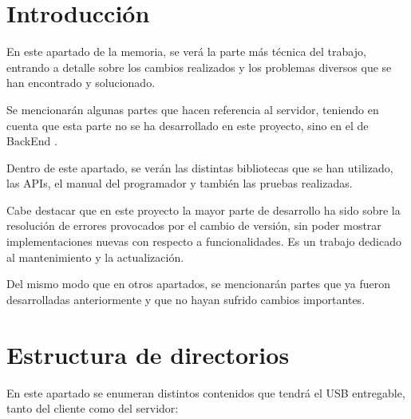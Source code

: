 
\section{Introducción}

En este apartado de la memoria, se verá la parte más técnica del trabajo, entrando a detalle sobre los cambios realizados y los problemas diversos que se han encontrado y solucionado.

Se mencionarán algunas partes que hacen referencia al servidor, teniendo en cuenta que esta parte no se ha desarrollado en este proyecto, sino en el de BackEnd \cite{tfg2}.

Dentro de este apartado, se verán las distintas bibliotecas que se han utilizado, las APIs, el manual del programador y también las pruebas realizadas. 

Cabe destacar que en este proyecto la mayor parte de desarrollo ha sido sobre la resolución de errores provocados por el cambio de versión, sin poder mostrar implementaciones nuevas con respecto a funcionalidades. Es un trabajo dedicado al mantenimiento y la actualización.

Del mismo modo que en otros apartados, se mencionarán partes que ya fueron desarrolladas anteriormente y que no hayan sufrido cambios importantes.

\section{Estructura de directorios}

En este apartado se enumeran distintos contenidos que tendrá el USB entregable, tanto del cliente como del servidor:

